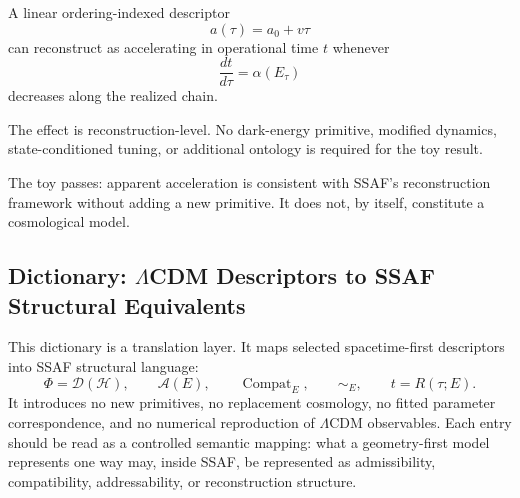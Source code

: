 \documentclass[aps,prx,onecolumn,11pt]{revtex4-2}
\theoremstyle{plain}
\theoremstyle{definition}
\theoremstyle{remark}
\newcommand{\Compat}{\operatorname{Compat}} %
\begin{document}
A linear ordering-indexed descriptor
\[
a(\tau)=a_0+v\tau
\]
can reconstruct as accelerating in operational time \(t\) whenever
\[
\frac{dt}{d\tau}
=
\alpha(E_\tau)
\]
decreases along the realized chain.

The effect is reconstruction-level. No dark-energy primitive, modified
dynamics, state-conditioned tuning, or additional ontology is required
for the toy result.

The toy passes: apparent acceleration is consistent with SSAF's
reconstruction framework without adding a new primitive. It does not,
by itself, constitute a cosmological model.

\subsection{Dictionary: \texorpdfstring{$\Lambda$CDM}{Lambda-CDM} Descriptors to SSAF Structural Equivalents}
\label{appE:LCDM_dictionary}

This dictionary is a translation layer. It maps selected
spacetime-first descriptors into SSAF structural language:
\[
\Phi=\mathcal D(\mathcal H),
\qquad
\mathcal A(E),
\qquad
\Compat_E,
\qquad
\sim_E,
\qquad
t=R(\tau;E).
\]
It introduces no new primitives, no replacement cosmology, no fitted
parameter correspondence, and no numerical reproduction of
\(\Lambda\)CDM observables. Each entry should be read as a controlled
semantic mapping: what a geometry-first model represents one way may,
inside SSAF, be represented as admissibility, compatibility,
addressability, or reconstruction structure.
\end{document}
